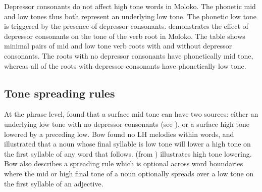 Depressor consonants do not affect high tone words in Moloko. The phonetic mid and low tones thus both represent an underlying low tone. The phonetic low tone is triggered by the presence of depressor consonants.   demonstrates the effect of depressor consonants on the tone of the verb root in Moloko. The table shows minimal pairs of mid and low tone verb roots with and without depressor consonants. The roots with no depressor consonants have phonetically mid tone, whereas all of the roots with depressor consonants have phonetically low tone.

\begin{table}
\caption{Effect of depressor consonants on tone of verb root\label{tab:2.13}}
\end{table}

\subsection{Tone spreading rules}\label{sec:2.4.2}
\hypertarget{RefHeading1210661525720847}{}
At the phrase level, \citealt{Bow1997c} found that a surface mid tone can have two sources: either an underlying low tone with no depressor consonants (see ), or a surface high tone lowered by a preceding low.  Bow found no LH melodies within words, and illustrated that a noun whose final syllable is low tone will lower a high tone on the first syllable of any word that follows.  (from \citealt{Bow1997c}) illustrates high tone lowering. Bow also describes a spreading rule which is optional across word boundaries where the mid or high final tone of a noun optionally spreads over a low tone on the first syllable of an adjective. 

